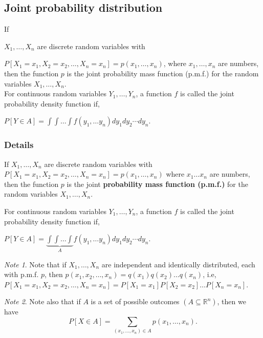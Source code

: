 \documentclass[12pt,a4paper]{article}
\theoremstyle{regla}
\theoremstyle{remark}
\newtheorem{notes}{Note}[section]
\theoremstyle{definition}
\theoremstyle{nonumberbreak}
\begin{document}
\subsection{Joint probability distribution}
\begin{fbox}
\begin{minipage}{0.97\textwidth}
If

$ X_1,\ldots, X_n$ are discrete random variables with

$P[X_1 = x_1, X_2 = x_2,\ldots, X_n = x_n] = p(x_1,\ldots, x_n) $, where $x_1, \ldots, x_n$ are numbers, then the function $p$ is the joint probability mass function (p.m.f.) for the random variables $X_1, \ldots, X_n$.\\

For continuous random variables $Y_1, \ldots, Y_n$, a function $f$ is called the joint probability density function if, 

$P [Y\in {A}] = \int\int\ldots\int f(y_1,\ldots y_n)dy_1dy_2 \cdots dy_n$.

\end{minipage}
\end{fbox}
\subsubsection{Details}
\begin{defn}
If $ X_1, \ldots, X_n$ are discrete random variables with $P[X_1 = x_1, X_2 = x_2,\ldots, X_n = x_n] = p(x_1,\ldots, x_n) $ where $x_1 \ldots x_n$ are numbers, then the function $p$ is the joint \textbf{ probability mass function (p.m.f.)} for the random variables $X_1, \ldots, X_n$.
\end{defn}

\begin{defn}
For continuous random variables $Y_1, \ldots, Y_n$, a function $f$ is called the joint probability density function if, 

$P [Y\in {A}] = \underbrace{\int\int\ldots\int}_{A} f(y_1,\ldots y_n)dy_1dy_2 \cdots dy_n$.
\end{defn}

\begin{notes}
Note that if $X_1, \ldots, X_n$ are independent and identically distributed, each with p.m.f. $p$, then $p(x_1, x_2, \ldots, x_n) = q(x_1)q(x_2)\ldots q(x_n)$,
i.e, $P [X_1 = x_1,  X_2 = x_2,\ldots, X_n= x_n] = P [X_1 = x_1] P[X_2 = x_2]\ldots P[X_n= x_n]$.
\end{notes}

\begin{notes}
Note also that if $A$ is a set of possible outcomes  $ (A  \subseteq \mathbb{R}^n)$, then
we have 
$$P[X \in {A}] = \sum_{(x_1,\ldots,x_n)\in A} p(x_1,\ldots, x_n).$$
\end{notes}
\end{document}
